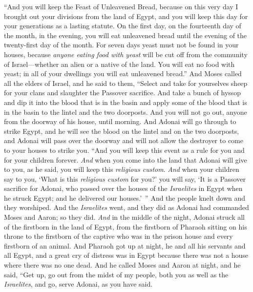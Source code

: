 \begin{biblechapter}
\verse “And you will keep the Feast of Unleavened Bread, because on this very day I brought out your divisions from the land of Egypt, and you will keep this day for your generations as a lasting statute.
\verse On the first day, on the fourteenth day of the month, in the evening, you will eat unleavened bread until the evening of the twenty-first day of the month.
\verse For seven days yeast must not be found in your houses, because \textit{anyone eating food with yeast} will be cut off from the community of Israel—whether an alien or a native of the land.
\verse You will eat no food with yeast; in all of your dwellings you will eat unleavened bread.”
\verse And Moses called all the elders of Israel, and he said to them, “Select and take for yourselves sheep for your clans and slaughter the Passover sacrifice.
\verse And take a bunch of hyssop and dip it into the blood that is in the basin and apply some of the blood that is in the basin to the lintel and the two doorposts. And you will not go out, anyone from the doorway of his house, until morning.
\verse And Adonai will go through to strike Egypt, and he will see the blood on the lintel and on the two doorposts, and Adonai will pass over the doorway and will not allow the destroyer to come to your houses to strike you.
\verse “And you will keep this event as a rule for you and for your children forever.
\verse \textit{And} when you come into the land that Adonai will give to you, as he said, you will keep this \textit{religious custom}.
\verse \textit{And} when your children say to you, ‘What is this \textit{religious custom} for you?’
\verse you will say, ‘It is a Passover sacrifice for Adonai, who passed over the houses of the \textit{Israelites} in Egypt when he struck Egypt; and he delivered our houses.’ ” And the people knelt down and they worshiped.
\verse And the \textit{Israelites} went, and they did as Adonai had commanded Moses and Aaron; so they did.
 \textit{And} in the middle of the night, Adonai struck all of the firstborn in the land of Egypt, from the firstborn of Pharaoh sitting on his throne to the firstborn of the captive who was in the prison house and every firstborn of an animal.
\verse And Pharaoh got up at night, he and all his servants and all Egypt, and a great cry of distress was in Egypt because there was not a house where there was no one dead.
\verse And he called Moses and Aaron at night, and he said, “Get up, go out from the midst of my people, both you as well as the \textit{Israelites}, and go, serve Adonai, as you have said.

\end{biblechapter}
